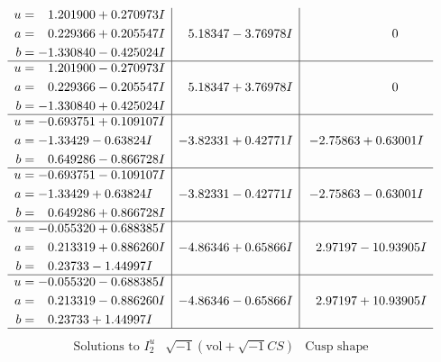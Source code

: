 \documentclass[1p]{elsarticle_modified}
\theoremstyle{definition}
\newcommand{\I}{\sqrt{-1}}
\begin{document}
$$\begin{array}{c|c|c}
\begin{aligned}
u &= \phantom{-}1.201900 + 0.270973 I \\
a &= \phantom{-}0.229366 + 0.205547 I \\
b &= -1.330840 - 0.425024 I\end{aligned}
 & \phantom{-}5.18347 - 3.76978 I & \phantom{-0.000000 } 0 \\ \hline\begin{aligned}
u &= \phantom{-}1.201900 - 0.270973 I \\
a &= \phantom{-}0.229366 - 0.205547 I \\
b &= -1.330840 + 0.425024 I\end{aligned}
 & \phantom{-}5.18347 + 3.76978 I & \phantom{-0.000000 } 0 \\ \hline\begin{aligned}
u &= -0.693751 + 0.109107 I \\
a &= -1.33429 - 0.63824 I \\
b &= \phantom{-}0.649286 - 0.866728 I\end{aligned}
 & -3.82331 + 0.42771 I & -2.75863 + 0.63001 I \\ \hline\begin{aligned}
u &= -0.693751 - 0.109107 I \\
a &= -1.33429 + 0.63824 I \\
b &= \phantom{-}0.649286 + 0.866728 I\end{aligned}
 & -3.82331 - 0.42771 I & -2.75863 - 0.63001 I \\ \hline\begin{aligned}
u &= -0.055320 + 0.688385 I \\
a &= \phantom{-}0.213319 + 0.886260 I \\
b &= \phantom{-}0.23733 - 1.44997 I\end{aligned}
 & -4.86346 + 0.65866 I & \phantom{-}2.97197 - 10.93905 I \\ \hline\begin{aligned}
u &= -0.055320 - 0.688385 I \\
a &= \phantom{-}0.213319 - 0.886260 I \\
b &= \phantom{-}0.23733 + 1.44997 I\end{aligned}
 & -4.86346 - 0.65866 I & \phantom{-}2.97197 + 10.93905 I\\
 \hline 
 \end{array}$$\newpage$$\begin{array}{c|c|c}  
\text{Solutions to }I^u_{2}& \I (\text{vol} + \sqrt{-1}CS) & \text{Cusp shape}\\
 \hline 
\begin{aligned}

\end{aligned}
\end{array}$$
\end{document}

